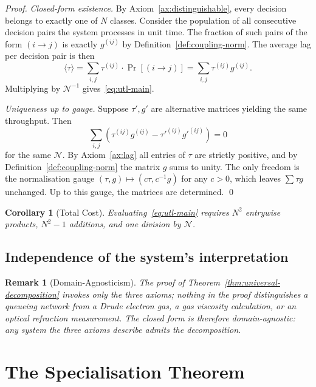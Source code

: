 \documentclass[twocolumn,11pt,a4paper]{article}
\newtheorem{corollary}[theorem]{Corollary}
\newtheorem{remark}[theorem]{Remark}
\newcommand{\Norm}{\mathcal{N}}
\newcommand{\lag}{\tau}
\newcommand{\cpl}{g}
\newcommand{\classcount}{N}
\begin{document}
\begin{proof}
\emph{Closed-form existence.} By Axiom~\ref{ax:distinguishable}, every decision belongs to exactly one of $\classcount$ classes. Consider the population of all consecutive decision pairs the system processes in unit time. The fraction of such pairs of the form $(i \to j)$ is exactly $\cpl^{(ij)}$ by Definition~\ref{def:coupling-norm}. The average lag per decision pair is then
\[
\langle \lag \rangle = \sum_{i,j} \lag^{(ij)} \cdot \Pr[(i \to j)] = \sum_{i,j} \lag^{(ij)} \cpl^{(ij)}.
\]
Multiplying by $\Norm^{-1}$ gives~\eqref{eq:utl-main}.

\emph{Uniqueness up to gauge.} Suppose $\lag', \cpl'$ are alternative matrices yielding the same throughput. Then
\[
\sum_{i,j} (\lag^{(ij)} \cpl^{(ij)} - \lag'^{(ij)} \cpl'^{(ij)}) = 0
\]
for the same $\Norm$. By Axiom~\ref{ax:lag} all entries of $\lag$ are strictly positive, and by Definition~\ref{def:coupling-norm} the matrix $\cpl$ sums to unity. The only freedom is the normalisation gauge $(\lag, \cpl) \mapsto (c\lag, c^{-1}\cpl)$ for any $c > 0$, which leaves $\sum \lag \cpl$ unchanged. Up to this gauge, the matrices are determined. \qed
\end{proof}

\begin{corollary}[Total Cost]
\label{cor:total-cost}
Evaluating~\eqref{eq:utl-main} requires $\classcount^2$ entrywise products, $\classcount^2 - 1$ additions, and one division by $\Norm$.
\end{corollary}

\subsection{Independence of the system's interpretation}

\begin{remark}[Domain-Agnosticism]
\label{rem:domain-agnostic}
The proof of Theorem~\ref{thm:universal-decomposition} invokes only the three axioms; nothing in the proof distinguishes a queueing network from a Drude electron gas, a gas viscosity calculation, or an optical refraction measurement. The closed form is therefore domain-agnostic: any system the three axioms describe admits the decomposition.
\end{remark}

\section{The Specialisation Theorem}
\label{sec:specialisations}
\end{document}
